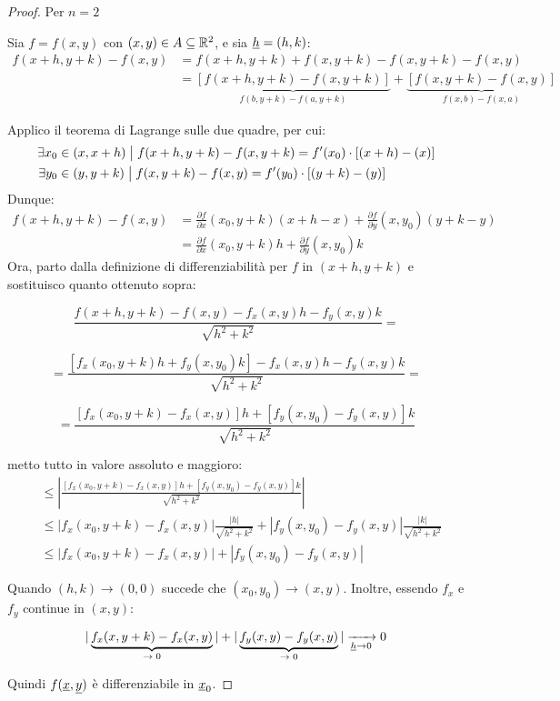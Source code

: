 \begin{proof}
    Per \(n=2\)

    Sia \(f = f(x,y)\) con \((x,y) \in A \subseteq \mathbb{R}^{2}\), e sia \(\underline{h} = (h,k)\):
    \begin{align*}
        f(x+h,y+k) - f(x,y) & = f(x+h,y+k) + f(x,y+k) - f(x,y+k) - f(x,y)                                                                        \\
                            & = \underbrace{[f(x+h,y+k) - f(x,y+k) ]}_{f(b,y+k) - f(a,y+k)} + \underbrace{[f(x,y+k) - f(x,y)]}_{f(x,b) - f(x,a)}
    \end{align*}

    Applico il teorema di Lagrange sulle due quadre, per cui:
    \begin{align*}
        \exists x_0 & \in (x,x+h) \;\big|\; f(x+h,y+k)-f(x,y+k) = f'(x_0) \cdot [(x+h)-(x)] \\
        \exists y_0 & \in (y,y+k) \;\big|\; f(x,y+k)-f(x,y) = f'(y_0) \cdot [(y+k)-(y)]
    \end{align*}
    Dunque:
    \begin{align*}
        f(x+h,y+k) - f(x,y) & = \frac{\partial f}{\partial x}(x_0,y+k) (x +h -x) + \frac{\partial f}{\partial y}(x,y_0) ( y + k -y) \\
                            & = \frac{\partial f}{\partial x}(x_0,y+k) h + \frac{\partial f}{\partial y}(x,y_0)k
    \end{align*}
    Ora, parto dalla definizione di differenziabilità per \(f\) in \((x+h,y+k)\) e sostituisco quanto ottenuto sopra:

    \[
        \frac{f(x+h,y+k) - f(x,y) - f_x(x,y)h - f_y(x,y) k}{\sqrt{h^{2}+k^{2}}} =
    \]

    \[
        = \frac{\left[ f_x(x_0,y+k) h + f_y(x,y_0) k \right] -f_x(x,y)h -f_y(x,y)k}{\sqrt{h^{2}+k^{2}}} =
    \]

    \[
        = \frac{[f_x(x_0,y+k) - f_x(x,y)] h + [f_y(x,y_0) - f_y(x,y)] k}{\sqrt{h^{2}+k^{2}}}
    \]

    metto tutto in valore assoluto e maggioro:
    \begin{align*}
        [\ldots] & \le \left|\frac{[f_x(x_0,y+k) - f_x(x,y)] h + [f_y(x,y_0) - f_y(x,y)] k}{\sqrt{h^{2}+k^{2}}}\right|                    \\
                 & \le |f_x(x_0,y+k) - f_x(x,y)| \frac{|h|}{\sqrt{h^{2}+k^{2}}} + | f_y(x,y_0) - f_y(x,y)| \frac{|k|}{\sqrt{h^{2}+k^{2}}} \\
                 & \le |f_x(x_0,y+k) - f_x(x,y)| + |f_y(x,y_0) - f_y(x,y)|
    \end{align*}

    \filbreak{}
    Quando \((h,k) \rightarrow (0,0)\) succede che \((x_0,y_0) \rightarrow (x,y)\). Inoltre, essendo \(f_x\) e \(f_y\) continue in \((x,y)\):

    \[
        |\underbrace{f_x(x,y+k) - f_x(x,y)}_\text{\(\rightarrow 0\)}| + |\underbrace{f_y(x,y) - f_y(x,y)}_\text{\(\rightarrow 0\)}| \xrightarrow[\underline{h} \to 0]{} 0
    \]

    Quindi \(f(\underline{x},\underline{y})\) è differenziabile in \(\underline{x}_0\).

\end{proof}

